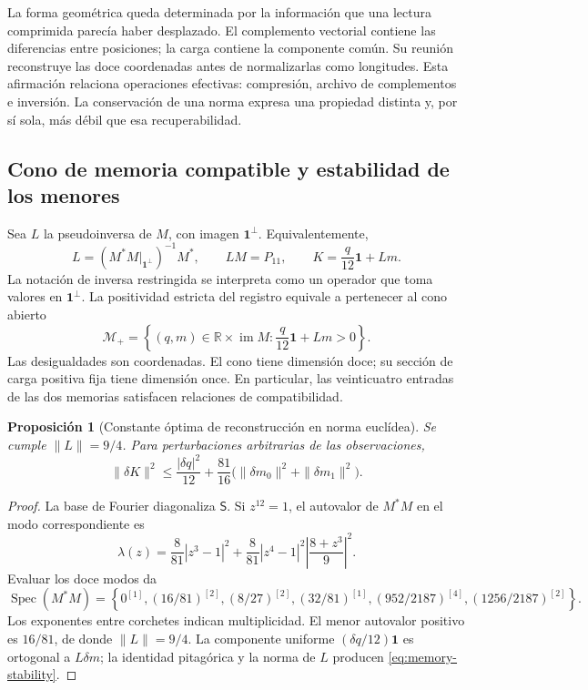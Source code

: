\documentclass[a4paper,10pt]{article}
\newtheorem{proposition}[theorem]{Proposición}
\theoremstyle{definition}\newtheorem{definition}[theorem]{Definición}
\theoremstyle{remark}\newtheorem{remark}[theorem]{Observación}
\newcommand{\RR}{\mathbb R}\newcommand{\QQ}{\mathbb Q}
\numberwithin{equation}{section}
\begin{document}
La forma geométrica queda determinada por la información que una lectura
comprimida parecía haber desplazado. El complemento vectorial contiene las
diferencias entre posiciones; la carga contiene la componente común. Su
reunión reconstruye las doce coordenadas antes de normalizarlas como
longitudes. Esta afirmación relaciona operaciones efectivas: compresión,
archivo de complementos e inversión. La conservación de una norma expresa
una propiedad distinta y, por sí sola, más débil que esa recuperabilidad.

\subsection{Cono de memoria compatible y estabilidad de los menores}

Sea \(L\) la pseudoinversa de \(M\), con imagen
\(\mathbf1^\perp\). Equivalentemente,
\[
 L=\left(M^*M\big|_{\mathbf1^\perp}\right)^{-1}M^*,
 \qquad LM=P_{11},\qquad K=\frac q{12}\mathbf1+Lm.
\]
La notación de inversa restringida se interpreta como un operador que toma
valores en \(\mathbf1^\perp\). La positividad estricta del registro
equivale a pertenecer al cono abierto
\begin{equation}
 \mathcal M_+=\left\{(q,m)\in\RR\times\operatorname{im}M:
 \frac q{12}\mathbf1+Lm>0\right\}.
 \label{eq:memory-positive-cone}
\end{equation}
Las desigualdades son coordenadas. El cono tiene dimensión doce; su sección
de carga positiva fija tiene dimensión once. En particular, las veinticuatro
entradas de las dos memorias satisfacen relaciones de compatibilidad.

\begin{proposition}[Constante óptima de reconstrucción en norma euclídea]
\label{prop:memory-stability}
Se cumple \(\|L\|=9/4\). Para perturbaciones arbitrarias de las observaciones,
\begin{equation}
 \|\delta K\|^2\leq\frac{|\delta q|^2}{12}
 +\frac{81}{16}\bigl(\|\delta m_0\|^2+\|\delta m_1\|^2\bigr).
 \label{eq:memory-stability}
\end{equation}
\end{proposition}
\begin{proof}
La base de Fourier diagonaliza \(\mathsf S\). Si \(z^{12}=1\),
el autovalor de \(M^*M\) en el modo correspondiente es
\[
 \lambda(z)=\frac8{81}|z^3-1|^2
 +\frac8{81}|z^4-1|^2\left|\frac{8+z^3}{9}\right|^2.
\]
Evaluar los doce modos da
\[
 \operatorname{Spec}(M^*M)=
 \left\{0^{[1]},(16/81)^{[2]},(8/27)^{[2]},(32/81)^{[1]},
 (952/2187)^{[4]},(1256/2187)^{[2]}\right\}.
\]
Los exponentes entre corchetes indican multiplicidad. El menor autovalor
positivo es \(16/81\), de donde \(\|L\|=9/4\). La componente uniforme
\((\delta q/12)\mathbf1\) es ortogonal a \(L\delta m\); la identidad
pitagórica y la norma de \(L\) producen \eqref{eq:memory-stability}.
\end{proof}
\end{document}
